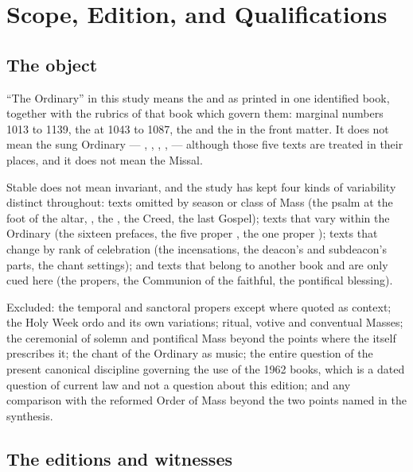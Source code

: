 \section{Scope, Edition, and Qualifications}

\subsection*{The object}

``The Ordinary'' in this study means the  and  as printed in one identified book, together with the rubrics of that
book which govern them: marginal numbers 1013 to 1139, the 
at 1043 to 1087, the  and the
 in the front matter. It does not
mean the sung Ordinary --- , ,
, ,  --- although those
five texts are treated in their places, and it does not mean the Missal.

Stable does not mean invariant, and the study has kept four kinds of variability
distinct throughout: texts omitted by season or class of Mass (the psalm at the
foot of the altar, , the , the Creed,
the last Gospel); texts that vary within the Ordinary (the sixteen prefaces,
the five proper , the one proper ); texts that change by rank of celebration (the incensations, the
deacon's and subdeacon's parts, the chant settings); and texts that belong to
another book and are only cued here (the propers, the Communion of the
faithful, the pontifical blessing).

Excluded: the temporal and sanctoral propers except where quoted as context;
the Holy Week ordo and its own  variations; ritual, votive
and conventual Masses; the ceremonial of solemn and pontifical Mass beyond the
points where the  itself prescribes it; the chant of the
Ordinary as music; the entire question of the present canonical discipline
governing the use of the 1962 books, which is a dated question of current law
and not a question about this edition; and any comparison with the reformed
Order of Mass beyond the two points named in the synthesis.

\subsection*{The editions and witnesses}


